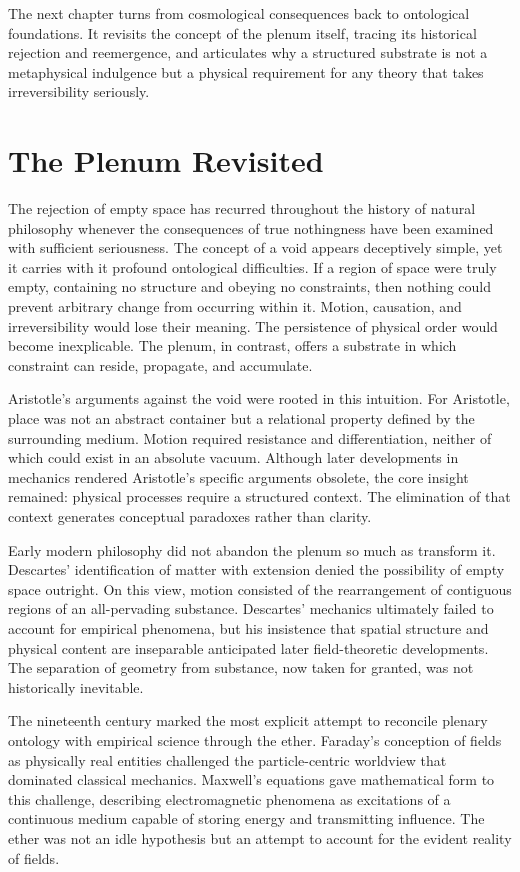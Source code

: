 \documentclass[11pt,oneside]{book}
\begin{document}
The next chapter turns from cosmological consequences back to ontological foundations. It revisits the concept of the plenum itself, tracing its historical rejection and reemergence, and articulates why a structured substrate is not a metaphysical indulgence but a physical requirement for any theory that takes irreversibility seriously.

\chapter{The Plenum Revisited}

The rejection of empty space has recurred throughout the history of natural philosophy whenever the consequences of true nothingness have been examined with sufficient seriousness. The concept of a void appears deceptively simple, yet it carries with it profound ontological difficulties. If a region of space were truly empty, containing no structure and obeying no constraints, then nothing could prevent arbitrary change from occurring within it. Motion, causation, and irreversibility would lose their meaning. The persistence of physical order would become inexplicable. The plenum, in contrast, offers a substrate in which constraint can reside, propagate, and accumulate.

Aristotle’s arguments against the void were rooted in this intuition. For Aristotle, place was not an abstract container but a relational property defined by the surrounding medium. Motion required resistance and differentiation, neither of which could exist in an absolute vacuum. Although later developments in mechanics rendered Aristotle’s specific arguments obsolete, the core insight remained: physical processes require a structured context. The elimination of that context generates conceptual paradoxes rather than clarity.

Early modern philosophy did not abandon the plenum so much as transform it. Descartes’ identification of matter with extension denied the possibility of empty space outright. On this view, motion consisted of the rearrangement of contiguous regions of an all-pervading substance. Descartes’ mechanics ultimately failed to account for empirical phenomena, but his insistence that spatial structure and physical content are inseparable anticipated later field-theoretic developments. The separation of geometry from substance, now taken for granted, was not historically inevitable.

The nineteenth century marked the most explicit attempt to reconcile plenary ontology with empirical science through the ether. Faraday’s conception of fields as physically real entities challenged the particle-centric worldview that dominated classical mechanics. Maxwell’s equations gave mathematical form to this challenge, describing electromagnetic phenomena as excitations of a continuous medium capable of storing energy and transmitting influence. The ether was not an idle hypothesis but an attempt to account for the evident reality of fields.
\end{document}
